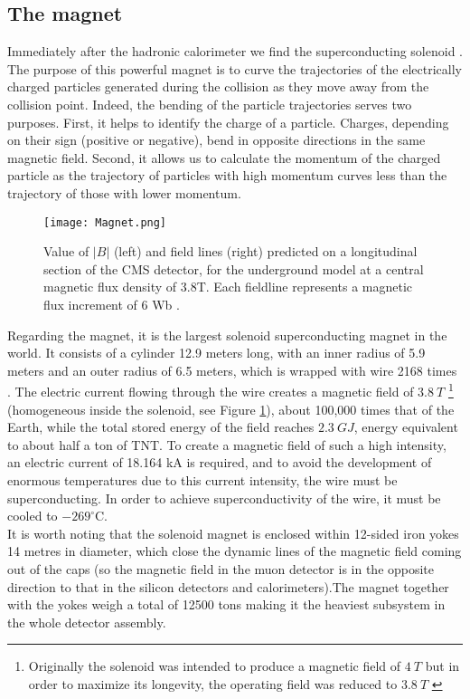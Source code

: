 \subsection{\label{sec:exp_CMS_4}The magnet}
\noindent Immediately after the hadronic calorimeter we find the superconducting solenoid \cite{Solenoid_5,Solenoid_1, Solenoid_2, Solenoid_3, Solenoid_4}. The purpose of this powerful magnet is to curve the trajectories of the electrically charged particles generated during the collision as they move away from the collision point. Indeed, the bending of the particle trajectories serves two purposes. First, it helps to identify the charge of a particle. Charges, depending on their sign (positive or negative), bend in opposite directions in the same magnetic field. Second, it allows us to calculate the momentum of the charged particle as the trajectory of particles with high momentum curves less than the trajectory of those with lower momentum.
\begin{figure}[H]
    \centering
    \texttt{[image: Magnet.png]}
    \caption{Value of $|B|$ (left) and field lines (right) predicted on a longitudinal section of the CMS detector, for the underground model at a central magnetic flux density of 3.8T. Each fieldline represents a magnetic flux increment of 6 Wb \cite{Chatrchyan:1215500}.}
    \label{fig:magnet}
\end{figure}
\indent Regarding the magnet, it is the largest solenoid superconducting magnet in the world. It consists of a cylinder 12.9 meters long, with an inner radius of 5.9 meters and an outer radius of 6.5 meters, which is wrapped with wire 2168 times \cite{Sphicas}. The electric current flowing through the wire creates a magnetic field of $3.8 \: T$ \footnote{Originally the solenoid was intended to produce a magnetic field of $4 \: T$ but in order to maximize its longevity, the operating field was reduced to $3. 8 \: T$ \cite{CMS_Collaboration_2010_4T}} (homogeneous inside the solenoid, see Figure \ref{fig:magnet}), about 100,000 times that of the Earth, while the total stored energy of the field reaches $2.3 \: GJ$, energy equivalent to about half a ton of TNT. To create a magnetic field of such a high intensity, an electric current of 18.164 kA is required, and to avoid the development of enormous temperatures due to this current intensity, the wire must be superconducting. In order to achieve superconductivity of the wire, it must be cooled to $-269^{\circ}$C.\\
\indent It is worth noting that the solenoid magnet is enclosed within 12-sided iron yokes 14 metres in diameter, which close the dynamic lines of the magnetic field coming out of the caps (so the magnetic field in the muon detector is in the opposite direction to that in the silicon detectors and calorimeters).The magnet together with the yokes weigh a total of 12500 tons making it the heaviest subsystem in the whole detector assembly.\\
